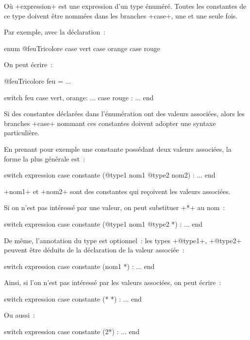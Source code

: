 Où \ggs+expression+ est une expression d'un type énuméré. Toutes les constantes de ce type doivent être nommées dans les branches \ggs+case+, une et une seule fois.

Par exemple, avec la déclaration~:

\begin{galgas}
enum @feuTricolore {
  case vert
  case orange
  case rouge
}
\end{galgas}

On peut écrire~:

\begin{galgas}
@feuTricolore feu = ...

switch feu
case vert, orange:
  ...
case rouge :
  ...
end
\end{galgas}

Si des constantes déclarées dans l'énumération ont des valeurs associées, alors les branches \ggs+case+ nommant ces constantes doivent adopter une syntaxe particulière. 

En prenant pour exemple une constante possédant deux valeurs associées, la forme la plus générale est~:

\begin{galgas}
switch expression
case constante (@type1 nom1 @type2 nom2) :
...
end
\end{galgas}

\ggs+nom1+ et \ggs+nom2+ sont des constantes qui reçoivent les valeurs associées.

Si on n'est pas intéressé par une valeur, on peut substituer \ggs+*+ au nom~:

\begin{galgas}
switch expression
case constante (@type1 nom1 @type2 *) :
...
end
\end{galgas}

De même, l'annotation du type est optionnel~: les types \ggs+@type1+, \ggs+@type2+ peuvent être déduits de la déclaration de la valeur associée~:

\begin{galgas}
switch expression
case constante (nom1 *) :
...
end
\end{galgas}

Ainsi, si l'on n'est pas intéressé par les valeurs associées, on peut écrire~:
\begin{galgas}
switch expression
case constante (* *) :
...
end
\end{galgas}

Ou aussi~:
\begin{galgas}
switch expression
case constante (2*) :
...
end
\end{galgas}


